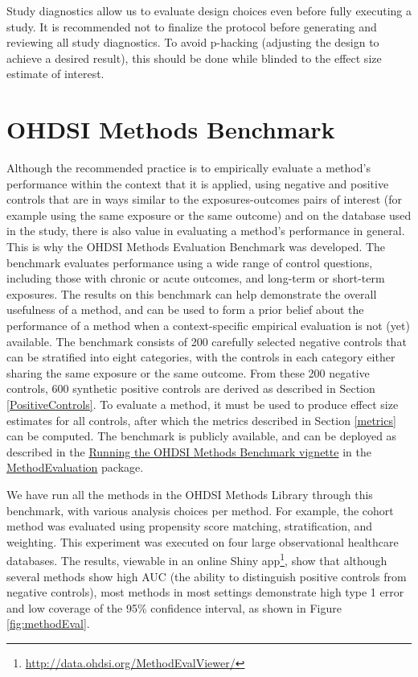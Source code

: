 \documentclass[11pt]{book}
\let\rmarkdownfootnote\footnote%
\def\footnote{\protect\rmarkdownfootnote}
\theoremstyle{definition}
\theoremstyle{definition}
\theoremstyle{definition}
\theoremstyle{remark}
\let\BeginKnitrBlock\begin \let\EndKnitrBlock\end
\begin{document}
\BeginKnitrBlock{rmdimportant}
Study diagnostics allow us to evaluate design choices even before fully
executing a study. It is recommended not to finalize the protocol before
generating and reviewing all study diagnostics. To avoid p-hacking
(adjusting the design to achieve a desired result), this should be done
while blinded to the effect size estimate of interest.
\EndKnitrBlock{rmdimportant}

\section{OHDSI Methods Benchmark}\label{ohdsi-methods-benchmark}


Although the recommended practice is to empirically evaluate a method's
performance within the context that it is applied, using negative and
positive controls that are in ways similar to the exposures-outcomes
pairs of interest (for example using the same exposure or the same
outcome) and on the database used in the study, there is also value in
evaluating a method's performance in general. This is why the OHDSI
Methods Evaluation Benchmark was developed. The benchmark evaluates
performance using a wide range of control questions, including those
with chronic or acute outcomes, and long-term or short-term exposures.
The results on this benchmark can help demonstrate the overall
usefulness of a method, and can be used to form a prior belief about the
performance of a method when a context-specific empirical evaluation is
not (yet) available. The benchmark consists of 200 carefully selected
negative controls that can be stratified into eight categories, with the
controls in each category either sharing the same exposure or the same
outcome. From these 200 negative controls, 600 synthetic positive
controls are derived as described in Section \ref{PositiveControls}. To
evaluate a method, it must be used to produce effect size estimates for
all controls, after which the metrics described in Section \ref{metrics}
can be computed. The benchmark is publicly available, and can be
deployed as described in the
\href{https://ohdsi.github.io/MethodEvaluation/articles/OhdsiMethodsBenchmark.html}{Running
the OHDSI Methods Benchmark vignette} in the
\href{https://ohdsi.github.io/MethodEvaluation/}{MethodEvaluation}
package.

We have run all the methods in the OHDSI Methods Library through this
benchmark, with various analysis choices per method. For example, the
cohort method was evaluated using propensity score matching,
stratification, and weighting. This experiment was executed on four
large observational healthcare databases. The results, viewable in an
online Shiny app\footnote{\url{http://data.ohdsi.org/MethodEvalViewer/}},
show that although several methods show high AUC (the ability to
distinguish positive controls from negative controls), most methods in
most settings demonstrate high type 1 error and low coverage of the 95\%
confidence interval, as shown in Figure \ref{fig:methodEval}.
\end{document}
